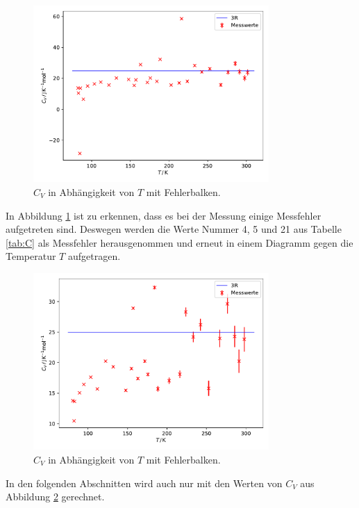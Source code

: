 \begin{figure}[H]
    \centering
    \includegraphics[width=0.8\textwidth]{build/C_V.pdf}
    \caption{$C_V$ in Abhängigkeit von $T$ mit Fehlerbalken.}
    \label{fig:C_V}
\end{figure}

In Abbildung \ref{fig:C_V} ist zu erkennen, dass es bei der Messung einige Messfehler aufgetreten sind. Deswegen werden die Werte Nummer 4, 5 und 21 aus Tabelle \ref{tab:C} als Messfehler herausgenommen und erneut in einem Diagramm gegen die Temperatur $T$ aufgetragen.

\begin{figure}[H]
    \centering
    \includegraphics[width=0.8\textwidth]{build/C_V_gefiltert.pdf}
    \caption{$C_V$ in Abhängigkeit von $T$ mit Fehlerbalken.}
    \label{fig:C_V_gefiltert}
\end{figure}

In den folgenden Abschnitten wird auch nur mit den Werten von $C_V$ aus Abbildung \ref{fig:C_V_gefiltert} gerechnet.

